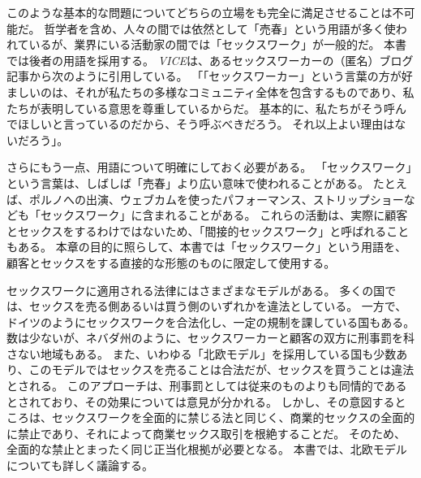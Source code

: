 \documentclass[paper=a4,book,openany]{jlreq}
\begin{document}
このような基本的な問題についてどちらの立場をも完全に満足させることは不可能だ。
哲学者を含め、人々の間では依然として「売春」という用語が多く使われているが、業界にいる活動家の間では「セックスワーク」が一般的だ。
本書では後者の用語を採用する。
\emph{VICE}は、あるセックスワーカーの（匿名）ブログ記事から次のように引用している。
「「セックスワーカー」という言葉の方が好ましいのは、それが私たちの多様なコミュニティ全体を包含するものであり、私たちが表明している意思を尊重しているからだ。
基本的に、私たちがそう呼んでほしいと言っているのだから、そう呼ぶべきだろう。
それ以上よい理由はないだろう」\citep{ratchford13:_why_is_canad_media_still}。

さらにもう一点、用語について明確にしておく必要がある。
「セックスワーク」という言葉は、しばしば「売春」より広い意味で使われることがある。
たとえば、ポルノへの出演、ウェブカムを使ったパフォーマンス、ストリップショーなども「セックスワーク」に含まれることがある。
これらの活動は、実際に顧客とセックスをするわけではないため、「間接的セックスワーク」と呼ばれることもある。
本章の目的に照らして、本書では「セックスワーク」という用語を、顧客とセックスをする直接的な形態のものに限定して使用する。

セックスワークに適用される法律にはさまざまなモデルがある。
多くの国では、セックスを売る側あるいは買う側のいずれかを違法としている。
一方で、ドイツのようにセックスワークを合法化し、一定の規制を課している国もある。
数は少ないが、ネバダ州のように、セックスワーカーと顧客の双方に刑事罰を科さない地域もある。
また、いわゆる「北欧モデル」を採用している国も少数あり、このモデルではセックスを売ることは合法だが、セックスを買うことは違法とされる。
このアプローチは、刑事罰としては従来のものよりも同情的であるとされており、その効果については意見が分かれる。
しかし、その意図するところは、セックスワークを全面的に禁じる法と同じく、商業的セックスの全面的に禁止であり、それによって商業セックス取引を根絶することだ。
そのため、全面的な禁止とまったく同じ正当化根拠が必要となる。
本書では、北欧モデルについても詳しく議論する。
\end{document}
